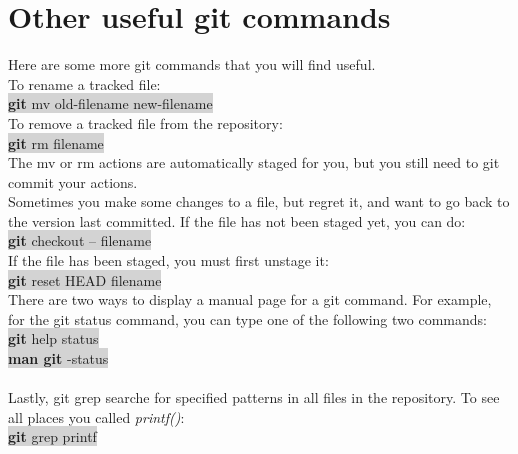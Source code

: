 \documentclass{article}
\begin{document}
  \section{\textbf{Other useful git commands}}
  Here are some more git commands that you will find useful.\\
  To rename a tracked file:\\
  \colorbox{lightgray}{
	  \textbf{git} mv old-filename new-filename
  }\\
  To remove a tracked file from the repository:\\
  \colorbox{lightgray}{
	  \textbf{git} rm filename
  }\\
  The mv or rm actions are automatically staged for you, but you still need to git commit your actions.\\
  Sometimes you make some changes to a file, but regret it, and want to go back to the version last committed. If the file has not been staged yet, you can do:\\
  \colorbox{lightgray}{
	  \textbf{git} checkout -- filename
  }\\
  If the file has been staged, you must first unstage it:\\
  \colorbox{lightgray}{
	  \textbf{git} reset HEAD filename
  }\\
  There are two ways to display a manual page for a git command. For example, for the git status command, you can type one of the following two commands:\\
  \colorbox{lightgray}{
	  \textbf{git} help status\\
	  \textbf{man git}%
	  -status\\
  }\\
  Lastly, git grep searche for specified patterns in all files in the repository. To see all places you called \textit{printf()}:\\
  \colorbox{lightgray}{
	  \textbf{git} grep printf
  }\\
\end{document}
